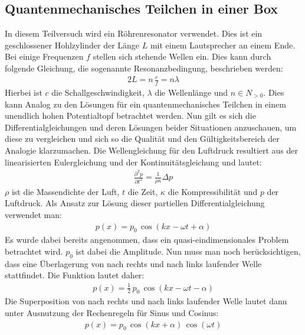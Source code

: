 \documentclass[german,  %
parskip=full,  %
]{scrartcl}
\begin{document}
\subsection{Quantenmechanisches Teilchen in einer Box}
In diesem Teilversuch wird ein Röhrenresonator verwendet. Dies ist ein geschlossener Hohlzylinder der Länge $L$ mit einem Lautsprecher an einem Ende. Bei einige Frequenzen $f$ stellen sich stehende Wellen ein. Dies kann durch folgende Gleichung, die sogenannte Resonanzbedingung, beschrieben werden:
\begin{align}
\label{1}2L = n \, \frac{c}{f} = n\lambda
\end{align}
Hierbei ist $c$ die Schallgeschwindigkeit, $\lambda$ die Wellenlänge und $n  \in N_{>0}$. Dies kann Analog zu den Lösungen für ein quantenmechanisches Teilchen in einem unendlich hohen Potentialtopf betrachtet werden.
\newline
\newline Nun gilt es sich die Differentialgleichungen und deren Lösungen beider Situationen anzuschauen, um diese zu vergleichen und sich so die Qualität und den Gültigkeitsbereich der Analogie klarzumachen.
\newline
\newline Die Wellengleichung für den Luftdruck resultiert aus der linearisierten Eulergleichung und der Kontinuitätsgleichung und lautet:
\begin{align}
\frac{\partial^2p}{\partial t^2}=\frac{1}{\rho \kappa} \Delta p
\end{align}
$\rho$ ist die Massendichte der Luft, $t$ die Zeit, $\kappa$ die Kompressibilität und $p$ der Luftdruck. Als Ansatz zur Lösung dieser partiellen Differentialgleichung verwendet man:
\begin{align}
p(x)=p_0 \, \cos(kx-\omega t +\alpha)
\end{align}
Es wurde dabei bereits angenommen, dass ein quasi-eindimensionales Problem betrachtet wird. $p_0$ ist dabei die Amplitude. 
Nun muss man noch berücksichtigen, dass eine Überlagerung von nach rechts und nach links laufender Welle stattfindet. Die Funktion lautet daher:
\begin{align}
p(x)=\frac{1}{2}\,p_0 \, \cos(kx-\omega t -\alpha)
\end{align}
Die Superposition von nach rechts und nach links laufender Welle lautet dann unter Ausnutzung der Rechenregeln für Sinus und Cosinus:
\begin{align}
p(x)=p_0 \, \cos(kx+\alpha)\, \cos(\omega t)
\end{align}
\end{document}
